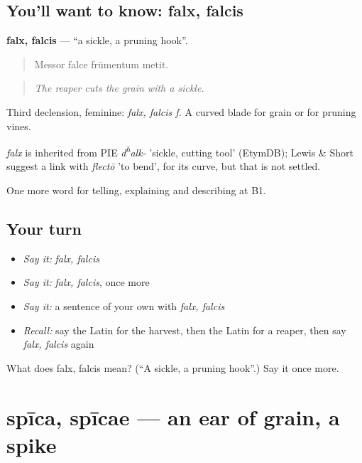\subsection*{You'll want to know: falx, falcis}
\textbf{falx, falcis} — \textquotedblleft{}a sickle, a pruning hook\textquotedblright{}.

\begin{quote}
Messor falce frūmentum metit.
\end{quote}

\begin{quote}
\emph{The reaper cuts the grain with a sickle.}
\end{quote}

Third declension, feminine: \emph{falx, falcis f.} A curved blade for grain or for pruning vines.

\begin{cousinweb}
\emph{falx} is inherited from PIE \emph{d\textsuperscript{h}alk-} 'sickle, cutting tool' (EtymDB); Lewis \& Short suggest a link with \emph{flectō} 'to bend', for its curve, but that is not settled.
\end{cousinweb}

\begin{grammarlens}[title={What you've built}]
One more word for telling, explaining and describing at B1.
\end{grammarlens}

\subsection*{Your turn}
\begin{itemize}
\raggedright
  \item \emph{Say it:} \emph{falx, falcis}
  \item \emph{Say it:} \emph{falx, falcis}, once more
  \item \emph{Say it:} a sentence of your own with \emph{falx, falcis}
  \item \emph{Recall:} say the Latin for the harvest, then the Latin for a reaper, then say \emph{falx, falcis} again
\end{itemize}

\begin{tcolorbox}[breakable,colback=teal!4,colframe=teal!35!black,title={Before you move on}]
What does falx, falcis mean? (\textquotedblleft{}A sickle, a pruning hook\textquotedblright{}.) Say it once more.
\end{tcolorbox}
\section[spīca, spīcae]{spīca, spīcae — an ear of grain, a spike}

